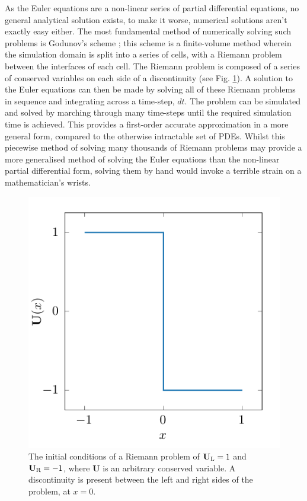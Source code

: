 \noindent
As the Euler equations are a non-linear series of partial differential equations, no general analytical solution exists, to make it worse, numerical solutions aren't exactly easy either.
The most fundamental method of numerically solving such problems is Godunov's scheme \parencite{godunov_difference_1959}; this scheme is a finite-volume method wherein the simulation domain is split into a series of cells, with a Riemann problem between the interfaces of each cell.
The Riemann problem is composed of a series of conserved variables on each side of a discontinuity (see Fig. \ref{fig:riemann}).
A solution to the Euler equations can then be made by solving all of these Riemann problems in sequence and integrating across a time-step, $dt$.
The problem can be simulated and solved by marching through many time-steps until the required simulation time is achieved.
This provides a first-order accurate approximation in a more general form, compared to the otherwise intractable set of PDEs. 
Whilst this piecewise method of solving many thousands of Riemann problems may provide a more generalised method of solving the Euler equations than the non-linear partial differential form, solving them by hand would invoke a terrible strain on a mathematician's wrists.

\begin{figure}[ht]
  \centering
  \includegraphics[]{assets/riemann-interface/riemann.pdf}
  \caption[A Riemann problem]{The initial conditions of a Riemann problem of $\mathbf{U}_\text{L} = 1$ and $\mathbf{U}_\text{R} = -1$, where $\mathbf{U}$ is an arbitrary conserved variable. A discontinuity is present between the left and right sides of the problem, at $x=0$.}
  \label{fig:riemann}
\end{figure}

